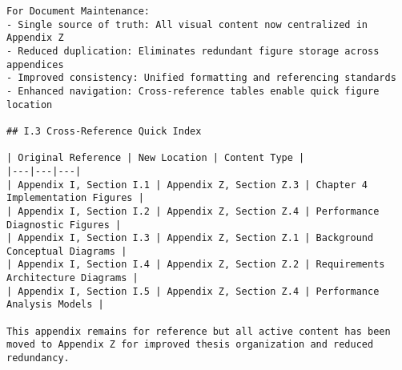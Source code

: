 \begin{verbatim}
For Document Maintenance:
- Single source of truth: All visual content now centralized in Appendix Z
- Reduced duplication: Eliminates redundant figure storage across appendices
- Improved consistency: Unified formatting and referencing standards
- Enhanced navigation: Cross-reference tables enable quick figure location

## I.3 Cross-Reference Quick Index

| Original Reference | New Location | Content Type |
|---|---|---|
| Appendix I, Section I.1 | Appendix Z, Section Z.3 | Chapter 4 Implementation Figures |
| Appendix I, Section I.2 | Appendix Z, Section Z.4 | Performance Diagnostic Figures |
| Appendix I, Section I.3 | Appendix Z, Section Z.1 | Background Conceptual Diagrams |
| Appendix I, Section I.4 | Appendix Z, Section Z.2 | Requirements Architecture Diagrams |
| Appendix I, Section I.5 | Appendix Z, Section Z.4 | Performance Analysis Models |

This appendix remains for reference but all active content has been moved to Appendix Z for improved thesis organization and reduced redundancy.
\end{verbatim}
